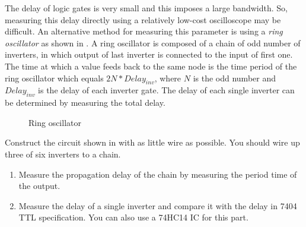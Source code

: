 \documentclass[12pt, logo=tehranDLDL/ut]{tehranDLDL}
\begin{document}
The delay of logic gates is very small and this imposes a large bandwidth. So, measuring this delay directly using a relatively low-cost oscilloscope may be difficult. An alternative method for measuring this parameter is using a \textit{ring oscillator} as shown in . A ring oscillator is composed of a chain of odd number of inverters, in which output of last inverter is connected to the input of first one. The time at which a value feeds back to the same node is the time period of the ring oscillator which equals $2N*Delay_{inv}$, where $N$ is the odd number and $Delay_{inv}$ is the delay of each inverter gate. The delay of each single inverter can be determined by measuring the total delay.

\begin{figure}
    \centering
    \caption{Ring oscillator\label{fig:ring}}
\end{figure}

Construct the circuit shown in  with as little wire as possible. You should wire up three of six inverters to a chain.

\begin{enumerate}
    \item Measure the propagation delay of the chain by measuring the period time of the output.
    \item Measure the delay of a single inverter and compare it with the delay in 7404 TTL specification. You can also use a 74HC14 IC for this part.
\end{enumerate}
\end{document}
